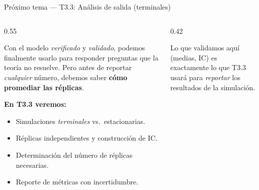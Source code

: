 \documentclass[aspectratio=1610, 10pt]{beamer}
\begin{document}
\begin{frame}{Próximo tema — T3.3: Análisis de salida (terminales)}
  \begin{columns}[T]
    \begin{column}{0.55\textwidth}
      \begin{situacionbox}
        \footnotesize
        Con el modelo \emph{verificado} y \emph{validado}, podemos finalmente
        usarlo para responder preguntas que la teoría no resuelve.
        Pero antes de reportar \emph{cualquier} número, debemos saber
        \textbf{cómo promediar las réplicas}.
      \end{situacionbox}

      \vspace{4pt}
      \textbf{En T3.3 veremos:}
      \begin{itemize}\footnotesize\itemsep2pt
        \item Simulaciones \emph{terminales} vs.\ estacionarias.
        \item Réplicas independientes y construcción de IC.
        \item Determinación del número de réplicas necesarias.
        \item Reporte de métricas con incertidumbre.
      \end{itemize}
    \end{column}
    \begin{column}{0.42\textwidth}

      \vspace{4pt}
      \begin{notabox}[Continuidad]
        \footnotesize
        Lo que validamos aquí (medias, IC) es exactamente lo que T3.3 usará para
        \emph{reportar} los resultados de la simulación.
      \end{notabox}
    \end{column}
  \end{columns}
\end{frame}
\end{document}
